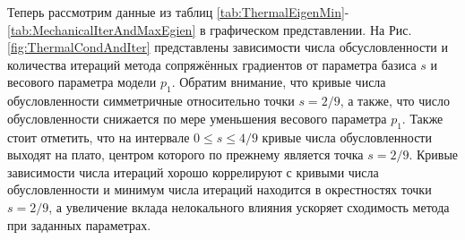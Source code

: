 Теперь рассмотрим данные из таблиц \ref{tab:ThermalEigenMin}-\ref{tab:MechanicalIterAndMaxEgien} в графическом представлении. На Рис. \ref{fig:ThermalCondAndIter} представлены зависимости числа обсусловленности и количества итераций метода сопряжённых градиентов от параметра базиса $s$ и весового параметра модели $p_1$. Обратим внимание, что кривые числа обусловленности симметричные относительно точки $s = 2/9$, а также, что число обусловленности снижается по мере уменьшения весового параметра $p_1$. Также стоит отметить, что на интервале $0 \leqslant s \leqslant 4/9$ кривые числа обусловленности выходят на плато, центром которого по прежнему является точка $s = 2/9$. Кривые зависимости числа итераций хорошо коррелируют с кривыми числа обусловленности и минимум числа итераций находится в окрестностях точки $s = 2/9$, а увеличение вклада нелокального влияния ускоряет сходимость метода при заданных параметрах.

